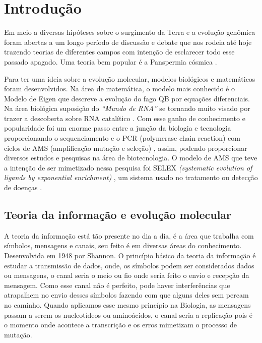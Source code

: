 \section{Introdução}

Em meio a diversas hipóteses sobre o surgimento da Terra e a evolução genômica
foram abertas a um longo período de discussão e debate que nos rodeia até hoje trazendo teorias de diferentes campos com intenção de esclarecer todo esse passado apagado. Uma teoria bem popular é a Panspermia cósmica \citep{1}. 

Para ter uma ideia sobre a evolução molecular, modelos biológicos \citep{17,18}  e
matemáticos \citep{19} foram desenvolvidos. Na área de matemática, o modelo mais conhecido é o Modelo de Eigen \citep{5,6} que descreve a evolução do fago QB por equações diferenciais. Na área biológica suposição do \emph{“Mundo de RNA”} \citep{7} se tornando muito visado por trazer a descoberta sobre RNA catalítico \citep{8,9}. Com esse ganho de conhecimento e popularidade foi um enorme passo entre a junção da biologia e tecnologia proporcionando o sequenciamento e o PCR (polymerase chain reaction) \citep{10} com ciclos de AMS (amplificação mutação e seleção) \citep{11}, assim, podendo proporcionar diversos estudos e pesquisas na área de biotecnologia. O modelo de AMS que teve a intenção de ser mimetizado nessa pesquisa foi SELEX \emph{(systematic evolution of ligands by exponential enrichment)} \citep{12,13}, um sistema usado no tratamento ou detecção de doenças \citep{14,15,16}.

\subsection{Teoria da informação e evolução molecular}
A teoria da informação \citep{4} está tão presente no dia a dia, é a área que trabalha com símbolos, mensagens e canais, seu feito é em diversas áreas do conhecimento.
Desenvolvida em 1948 por Shannon. O princípio básico da teoria da informação é estudar a transmissão de dados, onde, os símbolos podem ser considerados dados ou mensagens, o canal seria o meio ou fio onde seria feito o envio e recepção da mensagem. Como esse canal não é perfeito, pode haver interferências que atrapalhem no envio desses símbolos fazendo com que alguns deles sem percam no caminho. Quando aplicamos esse mesmo princípio na Biologia, as mensagens passam a serem os nucleotídeos ou aminoácidos, o canal seria a replicação pois é o momento onde acontece a transcrição e os erros mimetizam o processo de mutação.

